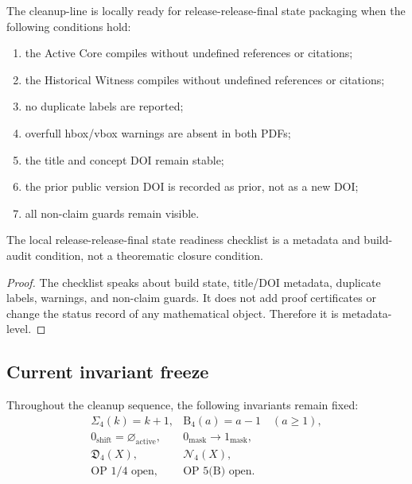 \begin{definition}
\label{def:v4010-local-cleanup-release-release-final state-readiness}
The cleanup-line is locally ready for release-release-final state packaging when
the following conditions hold:
\begin{enumerate}[leftmargin=*]
 \item the Active Core compiles without undefined references or citations;
 \item the Historical Witness compiles without undefined references or
 citations;
 \item no duplicate labels are reported;
 \item overfull hbox/vbox warnings are absent in both PDFs;
 \item the title and concept DOI remain stable;
 \item the prior public version DOI is recorded as prior, not as a new DOI;
 \item all non-claim guards remain visible.
\end{enumerate}
\end{definition}

\begin{lemma}
\label{lem:v4010-readiness-checklist-metadata-level}
The local release-release-final state readiness checklist is a metadata and build-audit
condition, not a theorematic closure condition.
\end{lemma}

\begin{proof}
The checklist speaks about build state, title/DOI metadata, duplicate labels,
warnings, and non-claim guards. It does not add proof certificates or change
the status record of any mathematical object. Therefore it is metadata-level.
\end{proof}

\subsection{Current invariant freeze}
\label{subsec:v4010-current-invariant-freeze}

\begin{definition}
\label{def:v4010-current-cleanup-invariant-freeze}
Throughout the cleanup sequence, the following invariants remain fixed:
\[
\begin{array}{ll}
\Sigma_4(k)=k+1, & \mathrm B_4(a)=a-1\quad(a\geq1),\\[0.2em]
0_{\mathrm{shift}}=\varnothing_{\mathrm{active}}, & 0_{\mathrm{mask}}\to1_{\mathrm{mask}},\\[0.2em]
\mathfrak D_4(X), & \mathcal N_4(X),\\[0.2em]
\text{OP~1/4 open}, & \text{OP~5(B) open}.
\end{array}
\]
\end{definition}

